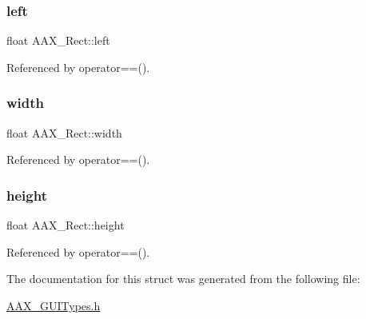 \subsubsection{\texorpdfstring{left}{left}}
{\footnotesize\ttfamily float A\+A\+X\+\_\+\+Rect\+::left}



Referenced by operator==().

\mbox{\label{a01613_a0105870bc2c8d461b76f67c73b9832f5}} 
\subsubsection{\texorpdfstring{width}{width}}
{\footnotesize\ttfamily float A\+A\+X\+\_\+\+Rect\+::width}



Referenced by operator==().

\mbox{\label{a01613_afee27da666682945c9cbfe2599f4ece4}} 
\subsubsection{\texorpdfstring{height}{height}}
{\footnotesize\ttfamily float A\+A\+X\+\_\+\+Rect\+::height}



Referenced by operator==().



The documentation for this struct was generated from the following file\+:\begin{DoxyCompactItemize}
\item 
\mbox{\hyperlink{a00503}{A\+A\+X\+\_\+\+G\+U\+I\+Types.\+h}}\end{DoxyCompactItemize}
